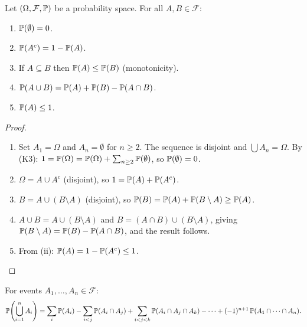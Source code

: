 \begin{theorem}
\label{thm:prob_properties}
Let $(\Omega, \mathcal{F}, \mathbb{P})$ be a probability space. For all
$A, B \in \mathcal{F}$:
\begin{enumerate}[label=(\roman*)]
    \item $\mathbb{P}(\emptyset) = 0$.
    \item $\mathbb{P}(A^c) = 1 - \mathbb{P}(A)$.
    \item If $A \subseteq B$ then $\mathbb{P}(A) \leq \mathbb{P}(B)$ \quad (monotonicity).
    \item $\mathbb{P}(A \cup B) = \mathbb{P}(A) + \mathbb{P}(B) - \mathbb{P}(A \cap B)$.
    \item $\mathbb{P}(A) \leq 1$.
\end{enumerate}
\end{theorem}

\begin{proof}
\begin{enumerate}[label=(\roman*)]
    \item Set $A_1 = \Omega$ and $A_n = \emptyset$ for $n \geq 2$. The sequence is
    disjoint and $\bigcup A_n = \Omega$. By (K3):
    $1 = \mathbb{P}(\Omega) = \mathbb{P}(\Omega) + \sum_{n \geq 2}\mathbb{P}(\emptyset)$,
    so $\mathbb{P}(\emptyset) = 0$.

    \item $\Omega = A \cup A^c$ (disjoint), so $1 = \mathbb{P}(A) + \mathbb{P}(A^c)$.

    \item $B = A \cup (B \setminus A)$ (disjoint), so
    $\mathbb{P}(B) = \mathbb{P}(A) + \mathbb{P}(B \setminus A) \geq \mathbb{P}(A)$.

    \item $A \cup B = A \cup (B \setminus A)$ and
    $B = (A \cap B) \cup (B \setminus A)$, giving
    $\mathbb{P}(B \setminus A) = \mathbb{P}(B) - \mathbb{P}(A \cap B)$, and the result follows.

    \item From (ii): $\mathbb{P}(A) = 1 - \mathbb{P}(A^c) \leq 1$.
\end{enumerate}
\end{proof}

\begin{theorem}
\label{thm:inclusion_exclusion}
For events $A_1, \ldots, A_n \in \mathcal{F}$:
\[
    \mathbb{P}\!\left(\bigcup_{i=1}^{n} A_i\right)
    = \sum_{i} \mathbb{P}(A_i)
    - \sum_{i < j} \mathbb{P}(A_i \cap A_j)
    + \sum_{i < j < k} \mathbb{P}(A_i \cap A_j \cap A_k)
    - \cdots
    + (-1)^{n+1}\, \mathbb{P}(A_1 \cap \cdots \cap A_n).
\]
\end{theorem}

